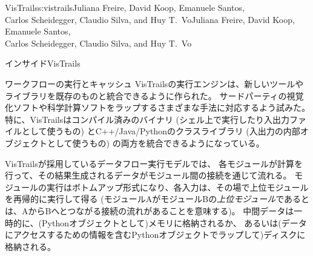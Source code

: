 \begin{aosachaptertoc}{VisTrails}{s:vistrails}{Juliana Freire, David Koop, Emanuele Santos, \\ Carlos Scheidegger, Claudio Silva, and Huy T.\ Vo}{Juliana Freire, David Koop, Emanuele Santos, \\ \hspace*{0.9cm} Carlos Scheidegger, Claudio Silva, and Huy T.\ Vo}
\begin{aosasect1}{インサイドVisTrails}
\begin{aosasect2}{ワークフローの実行とキャッシュ}
VisTrailsの実行エンジンは、新しいツールやライブラリを既存のものと統合できるように作られた。
サードパーティの視覚化ソフトや科学計算ソフトをラップするさまざまな手法に対応するよう試みた。
特に、VisTrailsはコンパイル済みのバイナリ
(シェル上で実行したり入出力ファイルとして使うもの)
とC++/Java/Pythonのクラスライブラリ
(入出力の内部オブジェクトとして使うもの)
の両方を統合できるようになっている。

VisTrailsが採用しているデータフロー実行モデルでは、
各モジュールが計算を行って、その結果生成されるデータがモジュール間の接続を通じて流れる。
モジュールの実行はボトムアップ形式になり、各入力は、その場で上位モジュールを再帰的に実行して得る
(モジュールAがモジュールBの\emph{上位モジュール}であるとは、AからBへとつながる接続の流れがあることを意味する)。
中間データは一時的に、(Pythonオブジェクトとして)メモリに格納されるか、
あるいは(データにアクセスするための情報を含むPythonオブジェクトでラップして)ディスクに格納される。


\end{aosasect2}
\end{aosasect1}
\end{aosachaptertoc}
